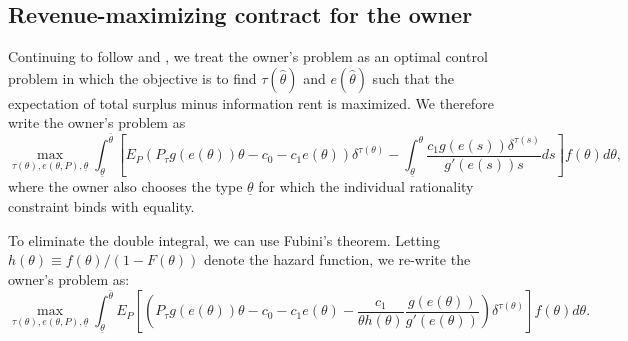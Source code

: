 \documentclass[12pt]{article}
\begin{document}
\subsection{Revenue-maximizing contract for the owner \label{appx:Opt}}

Continuing to follow \citet{bib:laffonttirole1986} and \citet{bib:board}, we treat the owner's problem as an optimal control problem in which the objective is to find $\tau(\hat{\theta})$ and $e(\hat{\theta})$ such that the expectation of total surplus minus information rent is maximized. We therefore write the owner's problem as
\begin{equation}
\max_{\tau(\theta),e(\theta,P),\underline{\theta}} \int_{\underline{\theta}}^{\bar\theta} \left[E_P\left(P_\tau g(e(\theta))\theta - c_0 - c_1e(\theta)\right)\delta^{\tau(\theta)} - \int_{\underline{\theta}}^\theta \frac{c_1g(e(s))\delta^{\tau(s)}}{g'(e(s))s}ds\right]f(\theta)d\theta, \label{eq:PrincipalProb}
\end{equation}
where the owner also chooses the type $\underline{\theta}$ for which the individual rationality constraint binds with equality.

To eliminate the double integral, we can use Fubini's theorem. Letting $h(\theta)\equiv f(\theta)/(1-F(\theta))$ denote the hazard function, we re-write the owner's problem as:
\begin{equation}
\max_{\tau(\theta),e(\theta,P),\underline{\theta}} \int_{\underline{\theta}}^{\bar\theta} E_P\left[\left(P_\tau g(e(\theta))\theta - c_0 - c_1e(\theta) - \frac{c_1}{\theta h(\theta)} \frac{g(e(\theta))}{g'(e(\theta))}\right)\delta^{\tau(\theta)}\right]f(\theta)d\theta. \label{eq:PrincipalProb2}
\end{equation}
\end{document}
